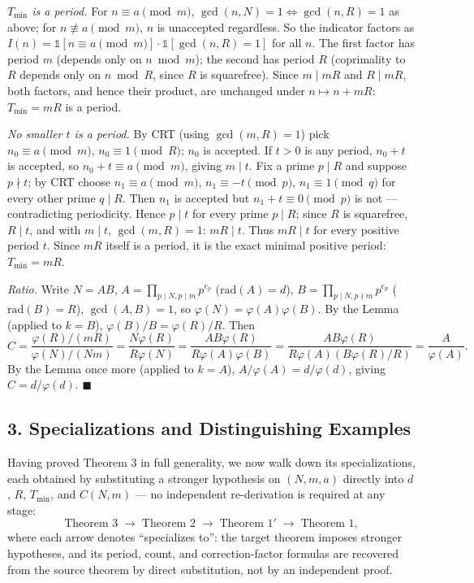 \documentclass[
]{article}
\begin{document}
\emph{\(T_{\min}\) is a period.} For \(n\equiv a\pmod m\),
\(\gcd(n,N)=1\iff\gcd(n,R)=1\) as above; for \(n\not\equiv a\pmod m\),
\(n\) is unaccepted regardless. So the indicator factors as
\(I(n)=\mathbb1[n\equiv a\pmod m]\cdot\mathbb1[\gcd(n,R)=1]\) for all
\(n\). The first factor has period \(m\) (depends only on \(n\bmod m\));
the second has period \(R\) (coprimality to \(R\) depends only on
\(n\bmod R\), since \(R\) is squarefree). Since \(m\mid mR\) and
\(R\mid mR\), both factors, and hence their product, are unchanged under
\(n\mapsto n+mR\): \(T_{\min}=mR\) is a period.

\emph{No smaller \(t\) is a period.} By CRT (using \(\gcd(m,R)=1\)) pick
\(n_0\equiv a\pmod m\), \(n_0\equiv1\pmod R\); \(n_0\) is accepted. If
\(t>0\) is any period, \(n_0+t\) is accepted, so
\(n_0+t\equiv a\pmod m\), giving \(m\mid t\). Fix a prime \(p\mid R\)
and suppose \(p\nmid t\); by CRT choose \(n_1\equiv a\pmod m\),
\(n_1\equiv-t\pmod p\), \(n_1\equiv1\pmod q\) for every other prime
\(q\mid R\). Then \(n_1\) is accepted but \(n_1+t\equiv0\pmod p\) is not
--- contradicting periodicity. Hence \(p\mid t\) for every prime
\(p\mid R\); since \(R\) is squarefree, \(R\mid t\), and with
\(m\mid t\), \(\gcd(m,R)=1\): \(mR\mid t\). Thus \(mR\mid t\) for every
positive period \(t\). Since \(mR\) itself is a period, it is the exact
minimal positive period: \(T_{\min}=mR\).

\emph{Ratio.} Write \(N=AB\), \(A=\prod_{p\mid N,p\mid m}p^{e_p}\)
(\(\mathrm{rad}(A)=d\)), \(B=\prod_{p\mid N,p\nmid m}p^{e_p}\)
(\(\mathrm{rad}(B)=R\)), \(\gcd(A,B)=1\), so
\(\varphi(N)=\varphi(A)\varphi(B)\). By the Lemma (applied to \(k=B\)),
\(\varphi(B)/B=\varphi(R)/R\). Then \[
C = \frac{\varphi(R)/(mR)}{\varphi(N)/(Nm)} = \frac{N\varphi(R)}{R\varphi(N)} = \frac{AB\varphi(R)}{R\varphi(A)\varphi(B)} = \frac{AB\varphi(R)}{R\varphi(A)(B\varphi(R)/R)} = \frac{A}{\varphi(A)}.
\] By the Lemma once more (applied to \(k=A\)),
\(A/\varphi(A)=d/\varphi(d)\), giving \(C=d/\varphi(d)\).
\(\blacksquare\)

\subsection{3. Specializations and Distinguishing
Examples}\label{specializations-and-distinguishing-examples}

Having proved Theorem 3 in full generality, we now walk down its
specializations, each obtained by substituting a stronger hypothesis on
\((N,m,a)\) directly into \(d\), \(R\), \(T_{\min}\), and \(C(N,m)\) ---
no independent re-derivation is required at any stage: \[
\text{Theorem 3} \;\longrightarrow\; \text{Theorem 2} \;\longrightarrow\; \text{Theorem }1' \;\longrightarrow\; \text{Theorem 1},
\] where each arrow denotes ``specializes to'': the target theorem
imposes stronger hypotheses, and its period, count, and
correction-factor formulas are recovered from the source theorem by
direct substitution, not by an independent proof.
\end{document}
